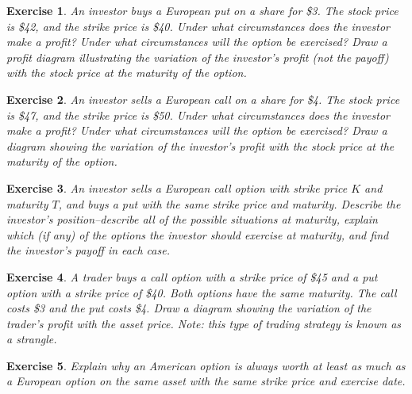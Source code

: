 \documentclass[letterpaper,10pt]{article}
\newtheorem{ex}{Exercise}
\begin{document}
\begin{ex}
An investor buys a European put on a share for \$3.  The stock price is \$42, and the strike price is \$40.  Under what circumstances does the investor make a profit?  Under what circumstances will the option be exercised?  Draw a profit diagram illustrating the variation of the investor's {\em profit} (not the payoff) with the stock price at the maturity of the option.
\end{ex}

\begin{ex}
An investor sells a European call on a share for \$4.  The stock price is \$47, and the strike price is \$50. Under what circumstances does the investor make a profit? Under what circumstances will the option be exercised? Draw a diagram showing the variation of the investor's profit with the stock price at the maturity of the option. 
\end{ex}

\begin{ex}
An investor sells a European call option with strike price $K$ and maturity $T$, and buys a put with the same strike price and maturity.  Describe the investor's position--describe all of the possible situations at maturity, explain which (if any) of the options the investor should exercise at maturity, and find the investor's payoff in each case.
\end{ex}

\begin{ex}
A trader buys a call option with a strike price of \$45 and a put option with a strike price of \$40. Both options have the same maturity. The call costs \$3 and the put costs \$4. Draw a diagram showing the variation of the trader's profit with the asset price.  Note:  this type of trading strategy is known as a {\em strangle}.
\end{ex}

\begin{ex}
Explain why an American option is always worth at least as much as a European option on the same asset with the same strike price and exercise date. 
\end{ex}
\end{document}
